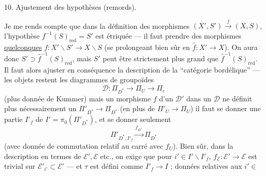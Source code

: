 

10. Ajustement des hypothèses (remords).

Je me rends compte que dans la définition des morphismes $(X',S')\xrightarrow{f}(X,S)$, l'hypothèse $f^{-1}(S)_{\mathrm{red}}=S'$ est étriquée --- il faut prendre des morphismes \uline{quelconques} $f:X'\backslash S'\to X\backslash S$ (se prolongeant bien sûr en $\widehat{f}:X'\to X$).
On aura donc $S'\supset\widehat{f}^{-1}(S)_{\mathrm{red}}$, mais $S'$ peut être strictement plus grand que $\widehat{f}^{-1}(S)_{\mathrm{red}}$.
Il faut alors ajuster en conséquence la description de la ``catégorie bordélique'' --- les objets restent les diagrammes de groupoïdes
\[
\mathcal{D}:\Pi_{D^*}\to\Pi_U\to\Pi_e
\]
(plus donnée de Kummer) mais un morphisme $f$ d'un $\mathcal{D}'$ dans un $\mathcal{D}$ ne définit plus nécessairement un $\Pi'_{D^*}\to\Pi_{D^*}$ (en plus de $\Pi'_U\to\Pi_U$) il faut se donner une partie $I'_f$ de $I'=\pi_0(\Pi'_{D^*})$, et se donner seulement
\[
\Pi'_{D^*,I'_f}\xrightarrow{f_{D^*}}\Pi_{D^*}
\]
(avec donnée de commutation  relatif au carré avec $f_U$).
Bien sûr, dans la description en termes de $\mathcal{E}',\mathcal{E}$ etc., on exige que pour $i'\in I'\backslash I'_f$, $f_{\mathcal{E}}:\mathcal{E}'\to\mathcal{E}$ est trivial sur $\mathcal{E}'_{i'}\subset\mathcal{E}'$ --- et $\tau$ est défini comme $I'_f\to I$ ;  données relatives aux $i'\in$

